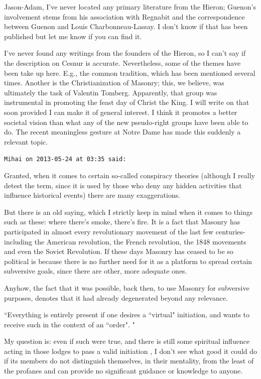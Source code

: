 \begin{footnotesize}
\begin{sffamily}
Jason-Adam, I've never located any primary literature from the Hieron; Guenon's involvement stems from his association with Regnabit and the correspondence between Guenon and Louis Charbonneau-Lassay. I don't know if that has been published but let me know if you can find it.

I've never found any writings from the founders of the Hieron, so I can't say if the description on Cesnur is accurate. Nevertheless, some of the themes have been take up here. E.g., the common tradition, which has been mentioned several times. Another is the Christianization of Masonry; this, we believe, was ultimately the task of Valentin Tomberg. Apparently, that group was instrumental in promoting the feast day of Christ the King. I will write on that soon provided I can make it of general interest. I think it promotes a better societal vision than what any of the new pseudo-right groups have been able to do. The recent meaningless gesture at Notre Dame has made this suddenly a relevant topic.


\hfill

\texttt{Mihai on 2013-05-24 at 03:35 said: }

Granted, when it comes to certain so-called conspiracy theories (although I really detest the term, since it is used by those who deny any hidden activities that influence historical events) there are many exaggerations.

But there is an old saying, which I strictly keep in mind when it comes to things such as these: where there's smoke, there's fire. It is a fact that Masonry has participated in almost every revolutionary movement of the last few centuries- including the American revolution, the French revolution, the 1848 movements and even the Soviet Revolution. If these days Masonry has ceased to be so political is because there is no further need for it as a platform to spread certain subversive goals, since there are other, more adequate ones.

Anyhow, the fact that it was possible, back then, to use Masonry for subversive purposes, denotes that it had already degenerated beyond any relevance. 

``Everything is entirely present if one desires a ``virtual" initiation, and wants to receive such in the context of an ``order". "

My question is: even if such were true, and there is still some spiritual influence acting in those lodges to pass a valid initiation , I don't see what good it could do if its members do not distinguish themselves, in their mentality, from the least of the profanes and can provide no significant guidance or knowledge to anyone.



\end{sffamily}
\end{footnotesize}
